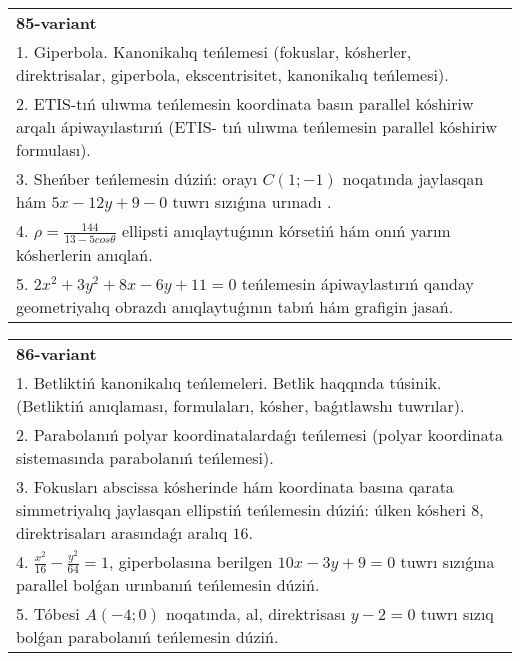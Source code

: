 \documentclass{article}
\begin{document}
\begin{tabular}{m{17cm}}
\textbf{85-variant}\\
1. Giperbola. Kanonikalıq teńlemesi (fokuslar, kósherler, direktrisalar, giperbola, ekscentrisitet, kanonikalıq teńlemesi).\\

2. ETIS-tıń ulıwma teńlemesin koordinata basın parallel kóshiriw arqalı ápiwayılastırıń (ETIS- tıń ulıwma teńlemesin parallel kóshiriw formulası).\\

3. Sheńber teńlemesin dúziń: orayı $C (1;-1) $ noqatında jaylasqan hám $5 x-12 y+9 -0$ tuwrı sızıǵına urınadı .\\

4. $\rho = \frac{144}{13 - 5cos\theta}$ ellipsti anıqlaytuǵının kórsetiń hám onıń yarım kósherlerin anıqlań.\\

5. $2x^{2} + 3y^{2} + 8x - 6y + 11 = 0$ teńlemesin ápiwaylastırıń qanday geometriyalıq obrazdı anıqlaytuǵının tabıń hám grafigin jasań.
\end{tabular}
\vspace{1cm}


\begin{tabular}{m{17cm}}
\textbf{86-variant}\\
1. Betliktiń kanonikalıq teńlemeleri. Betlik haqqında túsinik. (Betliktiń anıqlaması, formulaları, kósher, baǵıtlawshı tuwrılar).\\

2. Parabolanıń polyar koordinatalardaǵı teńlemesi (polyar koordinata sistemasında parabolanıń teńlemesi).\\

3. Fokusları abscissa kósherinde hám koordinata basına qarata simmetriyalıq jaylasqan ellipstiń teńlemesin dúziń: úlken kósheri $8$, direktrisaları arasındaǵı aralıq $16$.\\

4. $\frac{x^{2}}{16} - \frac{y^{2}}{64} = 1$, giperbolasına berilgen $10x - 3y + 9 = 0$ tuwrı sızıǵına parallel bolǵan urınbanıń teńlemesin dúziń.  \\

5. Tóbesi $A(-4;0)$ noqatında, al, direktrisası $y - 2 = 0$ tuwrı sızıq bolǵan parabolanıń teńlemesin dúziń.
\end{tabular}
\vspace{1cm}
\end{document}
